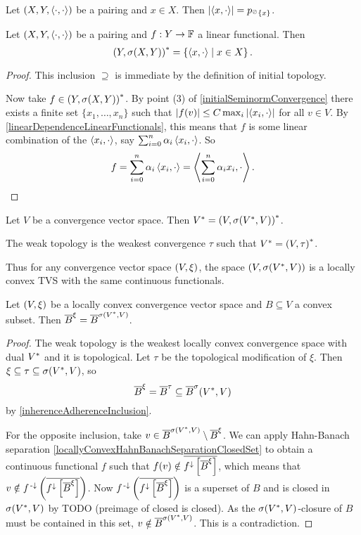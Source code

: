 \begin{lemma}
Let $(X,Y,\left\langle \cdot,\cdot \right\rangle)$ be a pairing and $x\in X$. Then $\left|\left\langle x,\cdot \right\rangle\right| = p_{^\oslash\{x\}}$.
\end{lemma}

\begin{proposition} \label{functionalContinuityWeakTopology}
Let $\left( X,Y,\left\langle \cdot,\cdot \right\rangle \right)$ be a pairing and $f: Y\to \mathbb{F}$ a linear functional. Then
\[ {(Y,\sigma(X,Y))}^* = \left\{ \left\langle x,\cdot \right\rangle \;\middle|\; x\in X \right\}. \]
\end{proposition}
\begin{proof}
This inclusion $\supseteq$ is immediate by the definition of initial topology.

Now take $f\in {(Y,\sigma(X,Y))}^*$. By point (3) of \ref{initialSeminormConvergence} there exists a finite set $\{x_1, \ldots, x_n\}$ such that $|f(v)| \leq C\max_{i}\left|\left\langle x_i, \cdot \right\rangle\right|$ for all $v\in V$. By \ref{linearDependenceLinearFunctionals}, this means that $f$ is some linear combination of the $\left\langle x_i,\cdot \right\rangle$, say $\sum_{i=0}^n \alpha_i \left\langle x_i, \cdot \right\rangle$. So
\[ f = \sum_{i=0}^n \alpha_i \left\langle x_i, \cdot \right\rangle = \left\langle \sum_{i=0}^n \alpha_i x_i, \cdot \right\rangle. \]
\end{proof}
\begin{corollary}
Let $V$ be a convergence vector space. Then $V^* = \left( V, \sigma(V^*, V) \right)^*$.

The weak topology is the weakest convergence $\tau$ such that $V^* = \left( V, \tau \right)^*$.
\end{corollary}
Thus for any convergence vector space $\left( V,\xi \right)$, the space $\left( V, \sigma(V^*, V) \right)$ is a locally convex TVS with the same continuous functionals.

\begin{proposition}
Let $\left( V, \xi \right)$ be a locally convex convergence vector space and $B\subseteq V$ a convex subset. Then $\overline{B}^\xi = \overline{B}^{\sigma({V}^*, V)}$.
\end{proposition}
\begin{proof}
The weak topology is the weakest locally convex convergence space with dual ${V}^*$ and it is topological. Let $\tau$ be the topological modification of $\xi$. Then $\xi \subseteq \tau \subseteq \sigma({V}^*, V)$, so
\[ \overline{B}^\xi = \overline{B}^\tau \subseteq \overline{B}^\sigma({V}^*, V) \]
by \ref{inherenceAdherenceInclusion}.

For the opposite inclusion, take $v\in \overline{B}^{\sigma({V}^*, V)} \setminus \overline{B}^\xi$. We can apply Hahn-Banach separation \ref{locallyConvexHahnBanachSeparationClosedSet} to obtain a continuous functional $f$ such that $f(v) \notin \overline{f^\downarrow\left[\overline{B}^\xi\right]}$, which means that $v \notin f^{\text{\hspace{0.15em}-}\downarrow}\left(\overline{f^\downarrow\left[\overline{B}^\xi\right]}\right)$. Now $f^{\text{\hspace{0.15em}-}\downarrow}\left(\overline{f^\downarrow\left[\overline{B}^\xi\right]}\right)$ is a superset of $B$ and is closed in $\sigma({V}^*, V)$ by TODO (preimage of closed is closed). As the $\sigma({V}^*, V)$-closure of $B$ must be contained in this set, $v\notin \overline{B}^{\sigma({V}^*, V)}$. This is a contradiction.
\end{proof}

